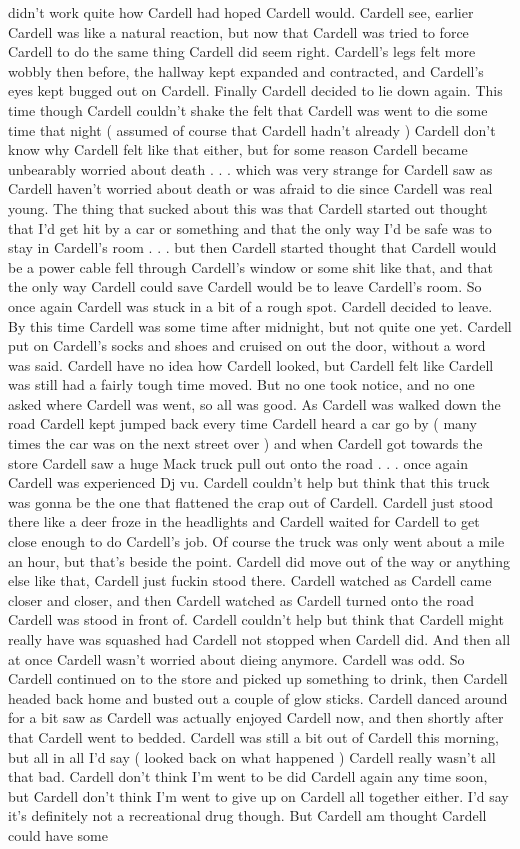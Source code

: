 \documentclass[12pt]{book}
\begin{document}
didn't work quite how Cardell had hoped Cardell would. Cardell see, earlier Cardell was like a natural reaction, but now that Cardell was tried to force Cardell to do the same thing Cardell did seem right. Cardell's legs felt more wobbly then before, the hallway kept expanded and contracted, and Cardell's eyes kept bugged out on Cardell. Finally Cardell decided to lie down again. This time though Cardell couldn't shake the felt that Cardell was went to die some time that night ( assumed of course that Cardell hadn't already ) Cardell don't know why Cardell felt like that either, but for some reason Cardell became unbearably worried about death . . . which was very strange for Cardell saw as Cardell haven't worried about death or was afraid to die since Cardell was real young. The thing that sucked about this was that Cardell started out thought that I'd get hit by a car or something and that the only way I'd be safe was to stay in Cardell's room . . . but then Cardell started thought that Cardell would be a power cable fell through Cardell's window or some shit like that, and that the only way Cardell could save Cardell would be to leave Cardell's room. So once again Cardell was stuck in a bit of a rough spot. Cardell decided to leave. By this time Cardell was some time after midnight, but not quite one yet. Cardell put on Cardell's socks and shoes and cruised on out the door, without a word was said. Cardell have no idea how Cardell looked, but Cardell felt like Cardell was still had a fairly tough time moved. But no one took notice, and no one asked where Cardell was went, so all was good. As Cardell was walked down the road Cardell kept jumped back every time Cardell heard a car go by ( many times the car was on the next street over ) and when Cardell got towards the store Cardell saw a huge Mack truck pull out onto the road . . . once again Cardell was experienced Dj vu. Cardell couldn't help but think that this truck was gonna be the one that flattened the crap out of Cardell. Cardell just stood there like a deer froze in the headlights and Cardell waited for Cardell to get close enough to do Cardell's job. Of course the truck was only went about  a mile an hour, but that's beside the point. Cardell did move out of the way or anything else like that, Cardell just fuckin stood there. Cardell watched as Cardell came closer and closer, and then Cardell watched as Cardell turned onto the road Cardell was stood in front of. Cardell couldn't help but think that Cardell might really have was squashed had Cardell not stopped when Cardell did. And then all at once Cardell wasn't worried about dieing anymore. Cardell was odd. So Cardell continued on to the store and picked up something to drink, then Cardell headed back home and busted out a couple of glow sticks. Cardell danced around for a bit saw as Cardell was actually enjoyed Cardell now, and then shortly after that Cardell went to bedded. Cardell was still a bit out of Cardell this morning, but all in all I'd say ( looked back on what happened ) Cardell really wasn't all that bad. Cardell don't think I'm went to be did Cardell again any time soon, but Cardell don't think I'm went to give up on Cardell all together either. I'd say it's definitely not a recreational drug though. But Cardell am thought Cardell could have some 
\end{document}
